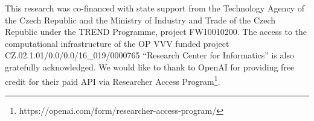 \documentclass[11pt]{article}
\begin{document}
This research was co-financed with state support from the Technology Agency of the Czech Republic and the Ministry of Industry and Trade of the Czech Republic under the TREND Programme, project FW10010200.
The access to the computational infrastructure of the OP VVV funded project CZ.02.1.01/0.0/0.0/16\_019/0000765 ``Research Center for Informatics'' is also gratefully acknowledged.
We would like to thank to OpenAI for providing free credit for their paid API via Researcher Access Program\footnote{https://openai.com/form/researcher-access-program/}.






\appendix


%

\end{document}
